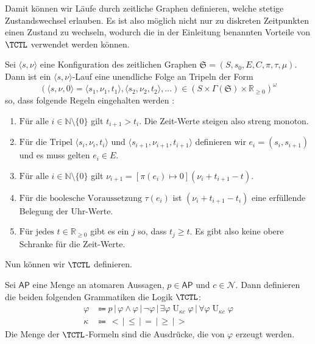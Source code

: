 Damit können wir Läufe durch zeitliche Graphen definieren, welche stetige Zustandswechsel erlauben. 
Es ist also möglich nicht nur zu diskreten Zeitpunkten einen Zustand zu wechseln, wodurch die in der Einleitung benannten Vorteile von $\TCTL$ verwendet werden können.

\begin{definition}
	Sei $\langle s,\nu \rangle$ eine Konfiguration des zeitlichen Graphen $\mathfrak{S}=(S,s_0,E,C,\pi,\tau,\mu)$. Dann ist ein $\langle s,\nu \rangle$-Lauf eine unendliche Folge an Tripeln der Form 
	$$(\langle s,\nu,0\rangle = \langle s_1,\nu_1,t_1\rangle,\langle s_2,\nu_2,t_2\rangle,\dots)\in (S\times \Gamma(\mathfrak{S})\times \mathbb{R}_{\geq 0})^\omega$$ 
	so, dass folgende Regeln eingehalten werden \cite{alur1990model}:
	\begin{enumerate}
		\item $\text{Für alle } i\in \mathbb{N}\setminus\{0\}$ gilt $t_{i+1}>t_i$. Die Zeit-Werte steigen also streng monoton.
		\item $\text{Für die Tripel } \langle s_i,\nu_i,t_i\rangle$ und $\langle s_{i+1},\nu_{i+1},t_{i+1}\rangle$ definieren wir $e_i=(s_i,s_{i+1})$ und es muss gelten $e_i\in E$.
		\item $\text{Für alle } i\in \mathbb{N}\setminus \{0\}$ gilt $\nu_{i+1}=[\pi(e_i)\mapsto 0](\nu_i+t_{i+1}-t)$.
		\item $\text{Für die boolesche Voraussetzung } \tau(e_i)$ ist $(\nu_i + t_{i+1}-t_i)$ eine erfüllende Belegung der Uhr-Werte.
		\item $\text{Für jedes } t\in \mathbb{R}_{\geq 0}$ gibt es ein $j$ so, dass $t_j\geq t$. Es gibt also keine obere Schranke für die Zeit-Werte.
	\end{enumerate}
\end{definition}

Nun können wir $\TCTL$ definieren.

\begin{definition}
	Sei $\mathsf{AP}$ eine Menge an atomaren Aussagen, $p\in \mathsf{AP}$ und $c\in \mathcal{N}$. Dann definieren die beiden folgenden Grammatiken die Logik $\TCTL$:
	\begin{align*}
		\varphi &\Coloneqq p \,|\, \varphi \land \varphi \,|\, \neg\varphi \,|\, \exists\varphi \operatorname{U}_{\kappa c}\varphi \,|\, \forall\varphi \operatorname{U}_{\kappa c}\varphi \\
		\kappa &\Coloneqq \, < \,|\, \leq \,|\, = \,|\, \geq \,|\, >
	\end{align*}
	Die Menge der $\TCTL$-Formeln sind die Ausdrücke, die von $\varphi$ erzeugt werden. \cite{alur1990model}
\end{definition}

